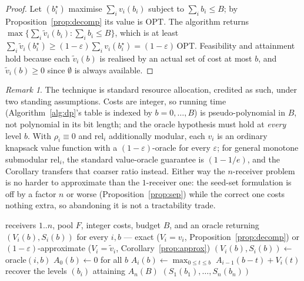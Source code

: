 \documentclass[sigconf,anonymous]{aamas}
\theoremstyle{remark}
\newtheorem{remark}{Remark}
\begin{document}
\begin{proof}
Let $(b_i^{\star})$ maximise $\sum_i v_i(b_i)$ subject to
$\sum_i b_i \le B$; by Proposition~\ref{prop:decomp} its value is
$\mathrm{OPT}$. The algorithm returns
$\max \{\sum_i \widetilde{v}_i(b_i) : \sum_i b_i \le B\}$, which is at
least $\sum_i \widetilde{v}_i(b_i^{\star}) \ge (1-\varepsilon)\sum_i
v_i(b_i^{\star}) = (1-\varepsilon)\,\mathrm{OPT}$. Feasibility and
attainment hold because each $\widetilde{v}_i(b)$ is realised by an
actual set of cost at most $b$, and $\widetilde{v}_i(b) \ge 0$ since
$\emptyset$ is always available.
\end{proof}

\begin{remark}
The technique is standard resource allocation, credited as such, under
two standing assumptions. Costs are integer, so running time
(Algorithm~\ref{alg:dp}'s table is indexed by $b=0,\dots,B$) is
pseudo-polynomial in $B$, not polynomial in its bit length; and the
oracle hypothesis must hold at \emph{every} level $b$. With
$\rho_i\equiv0$ and $\mathrm{rel}_i$ additionally modular, each $v_i$
is an ordinary knapsack value function with a
$(1-\varepsilon)$-oracle for every $\varepsilon$; for general monotone
submodular $\mathrm{rel}_i$, the standard value-oracle guarantee is
$(1-1/e)$, and the Corollary transfers that coarser ratio instead.
Either way the $n$-receiver problem is no harder to approximate than
the $1$-receiver one: the seed-set formulation is off by a factor $n$
or worse (Proposition~\ref{prop:sep}) while the correct one costs
nothing extra, so abandoning it is not a tractability trade.
\end{remark}

\begin{algorithm}[t]
\caption{Marginal allocation, given any per-receiver oracle}
\label{alg:dp}
\begin{algorithmic}[1]
\Require receivers $1..n$, pool $F$, integer costs, budget $B$, and an
  oracle returning $(V_i(b), S_i(b))$ for every $i,b$ --- exact
  ($V_i{=}v_i$, Proposition~\ref{prop:decomp}) or
  $(1-\varepsilon)$-approximate ($V_i{=}\widetilde{v}_i$,
  Corollary~\ref{prop:approx})
    \State $(V_i(b), S_i(b)) \gets$ oracle$(i, b)$
  \EndFor
\EndFor
\State $A_0(b) \gets 0$ for all $b$
  \State $A_i(b) \gets \max_{0 \le t \le b}\; A_{i-1}(b-t) + V_i(t)$
\EndFor
\State recover the levels $(b_i)$ attaining $A_n(B)$
\Return $(S_1(b_1),\dots,S_n(b_n))$
\end{algorithmic}
\end{algorithm}
\end{document}
